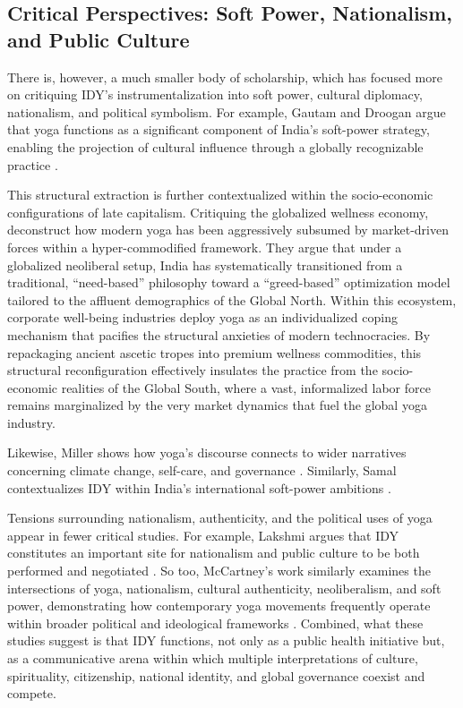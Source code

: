 \documentclass[11pt]{article}
\begin{document}
\subsection{Critical Perspectives: Soft Power, Nationalism, and Public Culture}

There is, however, a much smaller body of scholarship, which has focused more on critiquing IDY's instrumentalization into soft power, cultural diplomacy, nationalism, and political symbolism. For example, Gautam and Droogan argue that yoga functions as a significant component of India's soft-power strategy, enabling the projection of cultural influence through a globally recognizable practice \cite{gautam2018}.

This structural extraction is further contextualized within the socio-economic configurations of late capitalism. Critiquing the globalized wellness economy, \citet{sen2026yoga} deconstruct how modern yoga has been aggressively subsumed by market-driven forces within a hyper-commodified framework. They argue that under a globalized neoliberal setup, India has systematically transitioned from a traditional, ``need-based'' philosophy toward a ``greed-based'' optimization model tailored to the affluent demographics of the Global North. Within this ecosystem, corporate well-being industries deploy yoga as an individualized coping mechanism that pacifies the structural anxieties of modern technocracies. By repackaging ancient ascetic tropes into premium wellness commodities, this structural reconfiguration effectively insulates the practice from the socio-economic realities of the Global South, where a vast, informalized labor force remains marginalized by the very market dynamics that fuel the global yoga industry.

 Likewise, Miller shows how yoga's discourse connects to wider narratives concerning climate change, self-care, and governance \cite{miller2020}. Similarly, Samal contextualizes IDY within India's international soft-power ambitions \cite{samal2020}. 

Tensions surrounding nationalism, authenticity, and the political uses of yoga appear in fewer critical studies. For example, Lakshmi argues that IDY constitutes an important site for nationalism and public culture to be both performed and negotiated \cite{lakshmi2020}. So too, McCartney's work similarly examines the intersections of yoga, nationalism, cultural authenticity, neoliberalism, and soft power, demonstrating how contemporary yoga movements frequently operate within broader political and ideological frameworks \cite{mccartney2018,mccartney2019a,mccartney2019b,mccartney2025,mccartney2026}. Combined, what these studies suggest is that IDY functions, not only as a public health initiative but, as a communicative arena within which multiple interpretations of culture, spirituality, citizenship, national identity, and global governance coexist and compete.
\end{document}
